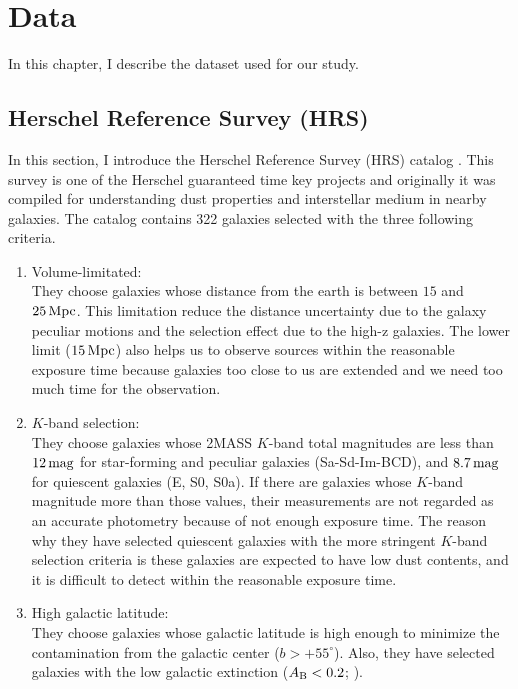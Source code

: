 \chapter{Data}
\begin{chapabstract}

In this chapter, I describe the dataset used for our study.



\end{chapabstract}

\section{Herschel Reference Survey (HRS)}\label{sec:HerschelReferenceSurvey}
In this section, I introduce the Herschel Reference Survey (HRS) catalog \citep{Boselli2010}.
This survey is one of the Herschel guaranteed time key projects and originally it was compiled for understanding dust properties and interstellar medium in nearby galaxies.
The catalog contains 322 galaxies selected with the three following criteria.

\begin{enumerate}
    \item Volume-limitated:\\
        They choose galaxies whose distance from the earth is between $15$ and $25\,\mathrm{Mpc}$.
        This limitation reduce the distance uncertainty due to the galaxy peculiar motions and the selection effect due to the high-z galaxies.
        The lower limit ($15\,\mathrm{Mpc}$) also helps us to observe sources within the reasonable exposure time because galaxies too close to us are extended and we need too much time for the observation.
    \item $K$-band selection:\\
        They choose galaxies whose 2MASS $K$-band total magnitudes are less than $12\,\mathrm{mag}$ for star-forming and peculiar galaxies (Sa-Sd-Im-BCD), and $8.7\,\mathrm{mag}$ for quiescent galaxies (E, S0, S0a).
        If there are galaxies whose $K$-band magnitude more than those values, their measurements are not regarded as an accurate photometry because of not enough exposure time.
        The reason why they have selected quiescent galaxies with the more stringent $K$-band selection criteria is these galaxies are expected to have low dust contents, and it is difficult to detect within the reasonable exposure time.
    \item High galactic latitude:\\
        They choose galaxies whose galactic latitude is high enough to minimize the contamination from the galactic center ($b > +55^{\circ}$).
        Also, they have selected galaxies with the low galactic extinction ($A_{\mathrm{B}} < 0.2$; \citealt{Schlegel1998}).
\end{enumerate}

